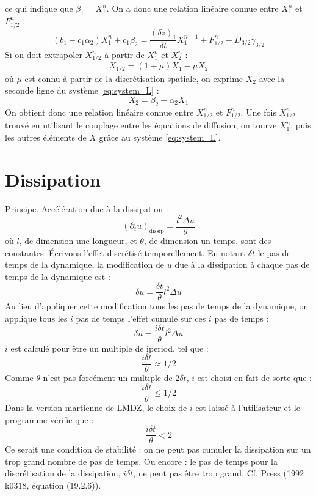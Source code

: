 \documentclass[a4paper,english,french]{article}
\begin{document}
ce qui indique que $\beta_1 = X_1^n$. On a donc une relation linéaire
connue entre $X_1^n$ et $F_{1/2}^n$ :
\begin{equation*}
  (b_1 - c_1 \alpha_2) X_1^n + c_1 \beta_2
  = \frac{(\delta z)_1}{\delta t} X_1^{n - 1} + F_{1/2}^n + D_{3/2} \gamma_{3/2}
\end{equation*}
Si on doit extrapoler $X_{1/2}^n$
à partir de $X_1^n$ et $X_2^n$ :
\begin{equation*}
  X_{1/2} = (1 + \mu) X_1 - \mu X_2
\end{equation*}
où $\mu$ est connu à partir de la discrétisation spatiale, on exprime
$X_2$ avec la seconde ligne du système \ref{eq:system_L} :
\begin{equation*}
  X_2 = \beta_2 - \alpha_2 X_1
\end{equation*}
On obtient donc une relation linéaire connue entre $X_{1/2}^n$ et
$F_{1/2}^n$. Une fois $X_{1/2}^n$ trouvé en utilisant le couplage
entre les équations de diffusion, on tourve $X_1^n$, puis les autres
éléments de $X$ grâce au système \ref{eq:system_L}.

\section{Dissipation}

Principe. Accélération due à la dissipation :
\begin{equation*}
  (\partial_t u)_\mathrm{dissip} = \frac{l^2 \Delta u}{\theta}
\end{equation*}
où $l$, de dimension une longueur, et $\theta$, de dimension un temps,
sont des constantes. \'Ecrivons l'effet discrétisé temporellement. En
notant $\delta t$ le pas de temps de la dynamique, la modification de
$u$ due à la dissipation à chaque pas de temps de la dynamique est :
\begin{equation*}
  \delta u = \frac{\delta t}{\theta} l^2 \Delta u
\end{equation*}
Au lieu d'appliquer cette modification tous les pas de temps de la
dynamique, on applique tous les $i$ pas de temps l'effet cumulé sur
ces $i$ pas de temps :
\begin{equation*}
  \delta u = \frac{i \delta t}{\theta} l^2 \Delta u
\end{equation*}
$i$ est calculé pour être un multiple de iperiod, tel que :
\begin{equation*}
  \frac{i \delta t}{\theta} \approx 1 / 2
\end{equation*}
Comme $\theta$ n'est pas forcément un multiple de $2 \delta t$, $i$
est choisi en fait de sorte que :
\begin{equation*}
  \frac{i \delta t}{\theta} \le 1 / 2
\end{equation*}
Dans la version martienne de LMDZ, le choix de $i$ est laissé à
l'utilisateur et le programme vérifie que :
\begin{equation*}
  \frac{i \delta t}{\theta} < 2
\end{equation*}
Ce serait une condition de stabilité : on ne peut pas cumuler la
dissipation sur un trop grand nombre de pas de temps. Ou encore : le
pas de temps pour la discrétisation de la dissipation, $i \delta t$,
ne peut pas être trop grand. Cf. Press (1992 k0318, équation
(19.2.6)).
\end{document}
